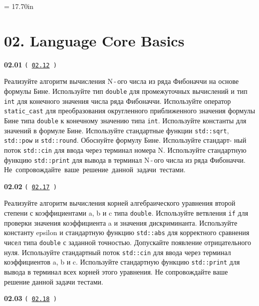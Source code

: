 \documentclass[a4paper,12pt]{article}
\begin{document}
\newpage\thispagestyle{empty}\pdfpageheight = 17.70in\enlargethispage{100in}

\section{02. Language Core Basics}

{\large \textbf{02.01} \texttt{(\,\href{https://github.com/i-s-m-mipt/Education/blob/master/projects/examples/source/02.12.cpp}{02.12}\,)}}

\bigskip

Реализуйте алгоритм вычисления N\,-\,ого числа из ряда Фибоначчи на основе формулы Бине. Используйте тип \lstinline{double} для промежуточных вычислений и тип \lstinline{int} для конечного значения числа ряда Фибоначчи. Используйте оператор \lstinline{static_cast} для преобразования округленного приближенного значения формулы Бине типа \lstinline{double} к конечному значению типа \lstinline{int}. Используйте константы для значений в формуле Бине. Используйте стандартные функции \lstinline{std::sqrt}, \lstinline{std::pow} и \lstinline{std::round}. Обоснуйте формулу Бине. Используйте стандарт- ный поток \lstinline{std::cin} для ввода через терминал номера N. Используйте стандартную функцию \lstinline{std::print} для вывода в терминал N\,-\,ого числа из ряда Фибоначчи. Не~сопровождайте~ваше~решение~данной~задачи~тестами.

\bigskip

{\large \textbf{02.02} \texttt{(\,\href{https://github.com/i-s-m-mipt/Education/blob/master/projects/examples/source/02.17.cpp}{02.17}\,)}}

\bigskip

Реализуйте алгоритм вычисления корней алгебраического уравнения второй степени с коэффициентами a, b и c типа \lstinline{double}. Используйте ветвления \lstinline{if} для проверки значения коэффициента a и значения дискриминанта. Используйте константу epsilon и стандартную функцию \lstinline{std::abs} для корректного сравнения чисел типа \lstinline{double} с заданной точностью. Допускайте появление отрицательного нуля. Используйте стандартный поток \lstinline{std::cin} для ввода через терминал коэффициентов a, b и c. Используйте стандартную функцию \lstinline{std::print} для вывода в терминал всех корней этого уравнения. Не сопровождайте ваше решение данной задачи тестами.

\bigskip

{\large \textbf{02.03} \texttt{(\,\href{https://github.com/i-s-m-mipt/Education/blob/master/projects/examples/source/02.18.cpp}{02.18}\,)}}
\end{document}

